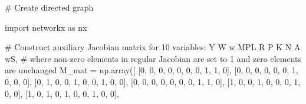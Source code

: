 \documentclass[
  letterpaper,
  DIV=11,
  numbers=noendperiod]{scrreprt}
\newenvironment{Shaded}{\begin{snugshade}}{\end{snugshade}}
\newcommand{\CommentTok}[1]{\textcolor[rgb]{0.37,0.37,0.37}{#1}}
\newcommand{\DecValTok}[1]{\textcolor[rgb]{0.68,0.00,0.00}{#1}}
\newcommand{\ImportTok}[1]{\textcolor[rgb]{0.00,0.46,0.62}{#1}}
\newcommand{\NormalTok}[1]{\textcolor[rgb]{0.00,0.23,0.31}{#1}}
\newcommand{\OperatorTok}[1]{\textcolor[rgb]{0.37,0.37,0.37}{#1}}
\begin{document}
\begin{tcolorbox}[enhanced jigsaw, titlerule=0mm, breakable, bottomrule=.15mm, toprule=.15mm, colbacktitle=quarto-callout-note-color!10!white, rightrule=.15mm, toptitle=1mm, opacityback=0, left=2mm, coltitle=black, title=\textcolor{quarto-callout-note-color}{\faInfo}\hspace{0.5em}{Python code}, colframe=quarto-callout-note-color-frame, opacitybacktitle=0.6, leftrule=.75mm, bottomtitle=1mm, arc=.35mm, colback=white]

\begin{Shaded}
\begin{Highlighting}[]
\CommentTok{\# Create directed graph}

\ImportTok{import}\NormalTok{ networkx }\ImportTok{as}\NormalTok{ nx}

\CommentTok{\# Construct auxiliary Jacobian matrix for 10 variables: Y W w MPL R P K N A wS,}
\CommentTok{\# where non{-}zero elements in regular Jacobian are set to 1 and zero elements are unchanged}
\NormalTok{M\_mat }\OperatorTok{=}\NormalTok{ np.array([}
\NormalTok{    [}\DecValTok{0}\NormalTok{, }\DecValTok{0}\NormalTok{, }\DecValTok{0}\NormalTok{, }\DecValTok{0}\NormalTok{, }\DecValTok{0}\NormalTok{, }\DecValTok{0}\NormalTok{, }\DecValTok{0}\NormalTok{, }\DecValTok{1}\NormalTok{, }\DecValTok{1}\NormalTok{, }\DecValTok{0}\NormalTok{],}
\NormalTok{    [}\DecValTok{0}\NormalTok{, }\DecValTok{0}\NormalTok{, }\DecValTok{0}\NormalTok{, }\DecValTok{0}\NormalTok{, }\DecValTok{0}\NormalTok{, }\DecValTok{0}\NormalTok{, }\DecValTok{1}\NormalTok{, }\DecValTok{0}\NormalTok{, }\DecValTok{0}\NormalTok{, }\DecValTok{0}\NormalTok{],}
\NormalTok{    [}\DecValTok{0}\NormalTok{, }\DecValTok{1}\NormalTok{, }\DecValTok{0}\NormalTok{, }\DecValTok{0}\NormalTok{, }\DecValTok{1}\NormalTok{, }\DecValTok{0}\NormalTok{, }\DecValTok{0}\NormalTok{, }\DecValTok{1}\NormalTok{, }\DecValTok{0}\NormalTok{, }\DecValTok{0}\NormalTok{],}
\NormalTok{    [}\DecValTok{0}\NormalTok{, }\DecValTok{0}\NormalTok{, }\DecValTok{0}\NormalTok{, }\DecValTok{0}\NormalTok{, }\DecValTok{0}\NormalTok{, }\DecValTok{0}\NormalTok{, }\DecValTok{0}\NormalTok{, }\DecValTok{1}\NormalTok{, }\DecValTok{1}\NormalTok{, }\DecValTok{0}\NormalTok{],}
\NormalTok{    [}\DecValTok{1}\NormalTok{, }\DecValTok{0}\NormalTok{, }\DecValTok{0}\NormalTok{, }\DecValTok{1}\NormalTok{, }\DecValTok{0}\NormalTok{, }\DecValTok{0}\NormalTok{, }\DecValTok{0}\NormalTok{, }\DecValTok{1}\NormalTok{, }\DecValTok{0}\NormalTok{, }\DecValTok{0}\NormalTok{],}
\NormalTok{    [}\DecValTok{1}\NormalTok{, }\DecValTok{0}\NormalTok{, }\DecValTok{1}\NormalTok{, }\DecValTok{0}\NormalTok{, }\DecValTok{1}\NormalTok{, }\DecValTok{0}\NormalTok{, }\DecValTok{0}\NormalTok{, }\DecValTok{1}\NormalTok{, }\DecValTok{0}\NormalTok{, }\DecValTok{0}\NormalTok{],}

\end{Highlighting}
\end{Shaded}
\end{tcolorbox}
\end{document}
